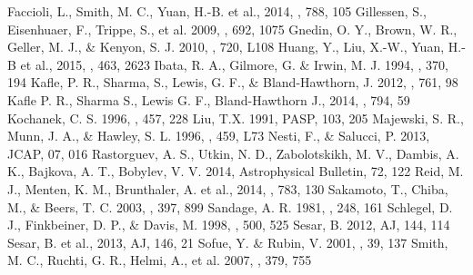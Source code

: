 \documentclass[12pt,preprint]{aastex}
\begin{document}
\begin{thebibliography}{99}
Faccioli, L., Smith, M. C., Yuan, H.-B. et al., 2014, \apj, 788, 105
Gillessen, S., Eisenhuaer, F., Trippe, S., et al. 2009, \apj, 692, 1075
Gnedin,  O.  Y.,  Brown,  W.  R.,  Geller,  M.  J.,  \&  Kenyon,  S.  J.  2010,
\apjl, 720, L108
Huang, Y., Liu, X.-W., Yuan, H.-B et al., 2015, \mnras, 463, 2623
Ibata, R. A., Gilmore, G. \& Irwin, M. J. 1994, \nat, 370, 194
Kafle, P. R., Sharma, S., Lewis, G. F., \& Bland-Hawthorn, J. 2012, \apj, 761, 98
Kafle P. R., Sharma S., Lewis G. F., Bland-Hawthorn J., 2014, \apj, 794, 59
Kochanek, C. S. 1996, \apj, 457, 228
Liu, T.X. 1991, PASP, 103, 205
Majewski, S. R., Munn, J. A., \& Hawley, S. L. 1996, \apj, 459, L73
Nesti, F., \& Salucci, P. 2013, JCAP, 07, 016
Rastorguev, A. S., Utkin, N. D., Zabolotskikh, M. V., Dambis, A. K., Bajkova, A. T., Bobylev, V. V. 2014, Astrophysical Bulletin, 72, 122
Reid, M. J., Menten, K. M., Brunthaler, A. et al., 2014, \apj, 783, 130
Sakamoto, T., Chiba, M., \& Beers, T. C. 2003, \aap, 397, 899
Sandage, A. R. 1981, \apj, 248, 161
Schlegel, D. J., Finkbeiner, D. P., \& Davis, M. 1998, \apj, 500, 525
Sesar, B. 2012, AJ, 144, 114
Sesar, B. et al., 2013, AJ, 146, 21
Sofue, Y. \& Rubin, V. 2001, \araa, 39, 137
Smith, M. C., Ruchti, G. R., Helmi, A., et al. 2007, \mnras, 379, 755

\end{thebibliography}
\end{document}
